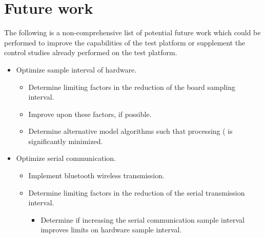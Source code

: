 \documentclass[crop=false,float=true,class=scrreprt]{standalone}
\begin{document}
\section{Future work}
\label{SEC:conclusions:futureWork}

The following is a non-comprehensive list of potential future work 
which could be performed to improve the capabilities of the test platform
or supplement the control studies already performed on the test platform.




\begin{itemize}[leftmargin=*]

\item Optimize sample interval of hardware.
\begin{itemize}[leftmargin=*, label=$\vcenter{\hbox{\tiny$\bullet$}}$]
    
  \item Determine limiting factors in the reduction of the board sampling interval.
  
  \item Improve upon these factors, if possible.
  
  \item Determine alternative model algorithms such that processing {\fns(} is significantly minimized.\\
        {}
  
\end{itemize}


\item Optimize serial communication.
\begin{itemize}[leftmargin=*, label=$\vcenter{\hbox{\tiny$\bullet$}}$]

  \item Implement bluetooth wireless transmission.

  \item Determine limiting factors in the reduction of the serial transmission interval.
  \begin{itemize}[leftmargin=*, label=$\cdot$]
  
    \item Determine if increasing the serial communication sample interval improves limits on hardware sample interval.\\
          {\fns{}}
    

\end{itemize}
\end{itemize}
\end{itemize}
\end{document}
